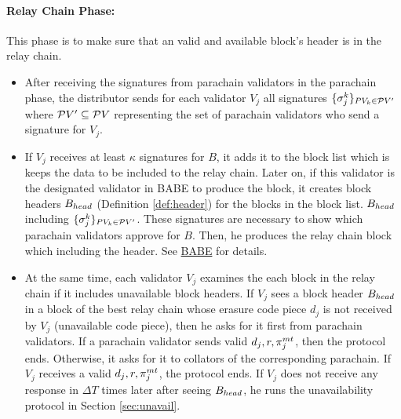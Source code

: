  


\paragraph{Relay Chain Phase:} This phase is to make sure that an valid and available block's header is in the relay chain. 

\begin{itemize}
    \item After receiving the signatures from parachain validators in the parachain phase, the distributor sends  for each validator $V_j$ all signatures  $\{\sigma_j^k\}_{PV_k \in \mathcal{P}V'} $ where $\mathcal{P}V' \subseteq \mathcal{P}V$ representing the set of parachain validators who send a signature for $V_j$. 

    \item If $V_j$ receives at least $\kappa$ signatures for $B$, it adds it to the block list which is keeps the data to be included to the relay chain. Later on, if this validator is the designated validator in BABE to produce the block, it creates block headers $B_{head}$ (Definition \ref{def:header}) for the blocks in the block list. $B_{head}$ including $\{\sigma_j^k\}_{PV_k \in \mathcal{P}V'} $.  These signatures are necessary to show which parachain validators approve for $B$. Then, he produces the relay chain block which including the header. See \href{http://research.web3.foundation/en/latest/polkadot/BABE/Babe/}{BABE} for details.

    \item At the same time, each validator $V_j$ examines the each block in the relay chain if it includes unavailable block headers. If $V_j$ sees a block header $B_{head}$ in a block of the best relay chain whose erasure code piece $d_j$ is not received by $V_j$ (unavailable code piece), then he asks for it first from parachain validators. If a parachain validator sends valid $d_j, r, \pi^{mt}_j $, then the protocol ends. Otherwise, it asks for it to collators of the corresponding parachain. If $V_j$ receives a valid $d_j, r, \pi^{mt}_j $, the protocol ends. If $V_j$ does not receive any response in $\Delta T$ times later after seeing $B_{head}$, he runs the unavailability protocol in Section \ref{sec:unavail}.

\end{itemize}

